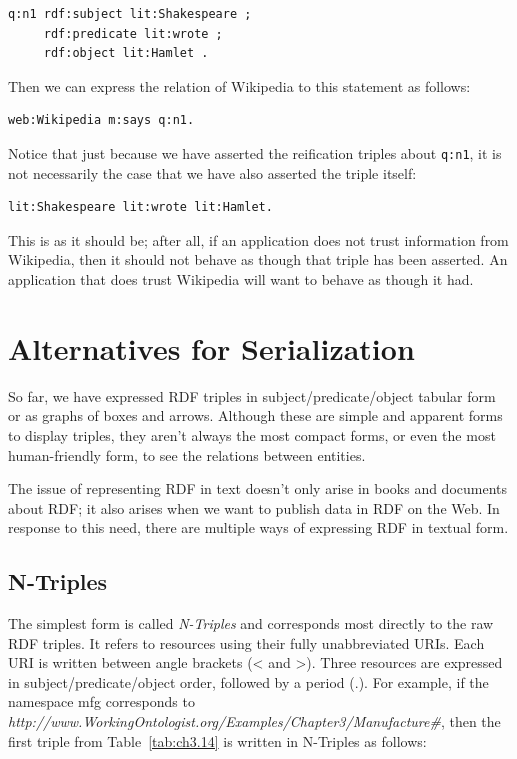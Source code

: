 \begin{lstlisting}
q:n1 rdf:subject lit:Shakespeare ; 
     rdf:predicate lit:wrote ; 
     rdf:object lit:Hamlet .
\end{lstlisting}

Then we can express the relation of Wikipedia to this statement as
follows:

\begin{lstlisting}
web:Wikipedia m:says q:n1.
\end{lstlisting}

Notice that just because we have asserted the reification triples about
\texttt{q:n1}, it is not necessarily the case that we have also asserted the
triple itself:

\begin{lstlisting}
lit:Shakespeare lit:wrote lit:Hamlet.
\end{lstlisting}

This is as it should be; after all, if an application does not trust
information from Wikipedia, then it should not behave as though that
triple has been asserted. An application that does trust Wikipedia will
want to behave as though it had.

\section{Alternatives for Serialization}
\label{serialization}
So far, we have expressed RDF triples in subject/predicate/object
tabular form or as graphs of boxes and arrows. Although these are simple
and apparent forms to display triples, they aren't always the most
compact forms, or even the most human-friendly form, to see the
relations between entities.

The issue of representing RDF in text doesn't only arise in books and
documents about RDF; it also arises when we want to publish data in RDF
on the Web. In response to this need, there are multiple ways of
expressing RDF in textual form.

\subsection{N-Triples}
\label{ntriples}

The simplest form is called \emph{N-Triples} and corresponds most directly to
the raw RDF triples. It refers to resources using their fully
unabbreviated URIs. Each URI is written between angle brackets
(\textless{} and \textgreater{}). Three resources are expressed in
subject/predicate/object order, followed by a period (.). For example,
if the namespace mfg corresponds to
\emph{http://www.WorkingOntologist.org/Examples/Chapter3/Manufacture\#}, then the first triple from Table~\ref{tab:ch3.14} is written
in N-Triples as follows:


